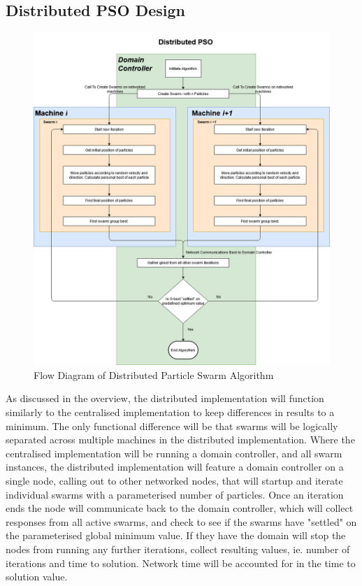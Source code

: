 \documentclass[oneside,12pt]{book}
\begin{document}
\subsection{Distributed PSO Design}
\begin{figure}[H]
    \centering
    \includegraphics[scale=0.4]{Images/FlowDiagramDistibutedPSO.png}
    \caption{Flow Diagram of Distributed Particle Swarm Algorithm}
    \label{fig:Flow Diagram of Distributed Particle Swarm Algorithm}
\end{figure}
As discussed in the overview, the distributed implementation will function similarly to the centralised implementation to keep differences in results to a minimum. The only functional difference will be that swarms will be logically separated across multiple machines in the distributed implementation. Where the centralised implementation will be running a domain controller, and all swarm instances, the distributed implementation will feature a domain controller on a single node, calling out to other networked nodes, that will startup and iterate individual swarms with a parameterised number of particles. Once an iteration ends the node will communicate back to the domain controller, which will collect responses from all active swarms, and check to see if the swarms have "settled" on the parameterised global minimum value. 
If they have the domain will stop the nodes from running any further iterations, collect resulting values, ie. number of iterations and time to solution. Network time will be accounted for in the time to solution value.
\end{document}
